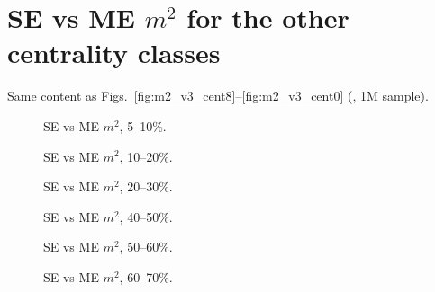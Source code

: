 \appendix
\section{SE vs ME $m^2$ for the other centrality classes}
\label{app:m2}
Same content as Figs.~\ref{fig:m2_v3_cent8}--\ref{fig:m2_v3_cent0} (, 1M sample).

\begin{figure}[H]
\centering
{}
\caption{SE vs ME $m^2$, 5--10\%.}
\end{figure}
\begin{figure}[H]
\centering
{}
\caption{SE vs ME $m^2$, 10--20\%.}
\end{figure}
\begin{figure}[H]
\centering
{}
\caption{SE vs ME $m^2$, 20--30\%.}
\end{figure}
\begin{figure}[H]
\centering
{}
\caption{SE vs ME $m^2$, 40--50\%.}
\end{figure}
\begin{figure}[H]
\centering
{}
\caption{SE vs ME $m^2$, 50--60\%.}
\end{figure}
\begin{figure}[H]
\centering
{}
\caption{SE vs ME $m^2$, 60--70\%.}
\end{figure}
